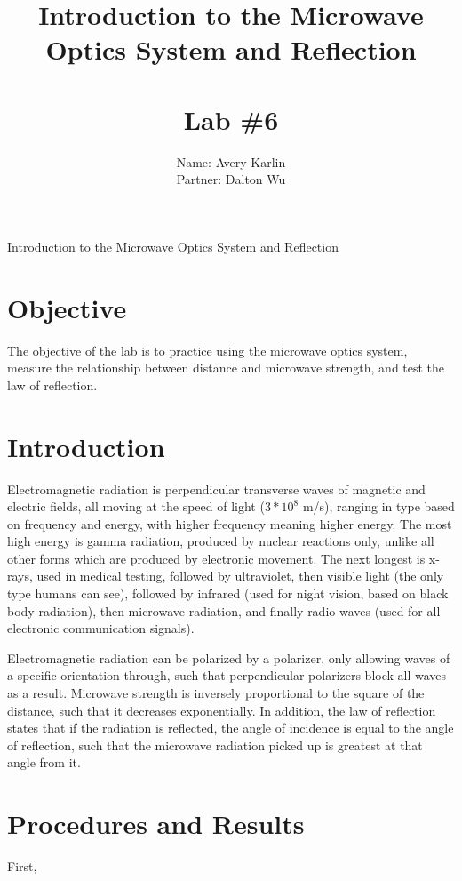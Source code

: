 \documentclass[11pt, titlepage]{article}
\title{Introduction to the Microwave Optics System and Reflection \\ \ \\ \large Lab \#6}
\author{Name: Avery Karlin \\ Partner: Dalton Wu}
\date{}
\begin{document}
\maketitle

\begin{center}
\LARGE Introduction to the Microwave Optics System and Reflection
\end{center}

\section*{Objective}
The objective of the lab is to practice using the microwave optics system, measure the relationship between distance and microwave strength, and test the law of reflection.

\section*{Introduction}
Electromagnetic radiation is perpendicular transverse waves of magnetic and electric fields, all moving at the speed of light ($3 * 10^8$ m/s), ranging in type based on frequency and energy, with higher frequency meaning higher energy. The most high energy is gamma radiation, produced by nuclear reactions only, unlike all other forms which are produced by electronic movement. The next longest is x-rays, used in medical testing, followed by ultraviolet, then visible light (the only type humans can see), followed by infrared (used for night vision, based on black body radiation), then microwave radiation, and finally radio waves (used for all electronic communication signals).

Electromagnetic radiation can be polarized by a polarizer, only allowing waves of a specific orientation through, such that perpendicular polarizers block all waves as a result. Microwave strength is inversely proportional to the square of the distance, such that it decreases exponentially. In addition, the law of reflection states that if the radiation is reflected, the angle of incidence is equal to the angle of reflection, such that the microwave radiation picked up is greatest at that angle from it.

\section*{Procedures and Results}

First, 
\end{document}
